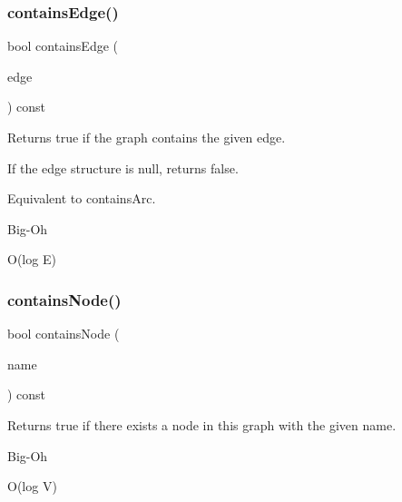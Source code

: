 \subsubsection{\texorpdfstring{contains\+Edge()}{containsEdge()}\hspace{0.1cm}{\footnotesize\ttfamily [3/3]}}
{\footnotesize\ttfamily bool contains\+Edge (\begin{DoxyParamCaption}\item[{Edge\+Gen$<$ V, E $>$ $\ast$}]{edge }\end{DoxyParamCaption}) const}



Returns true if the graph contains the given edge. 

If the edge structure is null, returns false.

Equivalent to contains\+Arc. \begin{DoxyRefDesc}{Big-\/\+Oh}
\item[\mbox{\hyperlink{BigOh__BigOh000013}{Big-\/\+Oh}}]O(log E) \end{DoxyRefDesc}
\mbox{\label{classGraph_ac0beb77e8a238c2898ab851df71eeefe}} 
\subsubsection{\texorpdfstring{contains\+Node()}{containsNode()}\hspace{0.1cm}{\footnotesize\ttfamily [1/2]}}
{\footnotesize\ttfamily bool contains\+Node (\begin{DoxyParamCaption}\item[{const std\+::string \&}]{name }\end{DoxyParamCaption}) const\hspace{0.3cm}{\ttfamily [inherited]}}



Returns true if there exists a node in this graph with the given name. 

\begin{DoxyRefDesc}{Big-\/\+Oh}
\item[\mbox{\hyperlink{BigOh__BigOh000056}{Big-\/\+Oh}}]O(log V) \end{DoxyRefDesc}
\mbox{\label{classGraph_a4f540ebc07c4e46a0bb7fee76a93386c}} 
